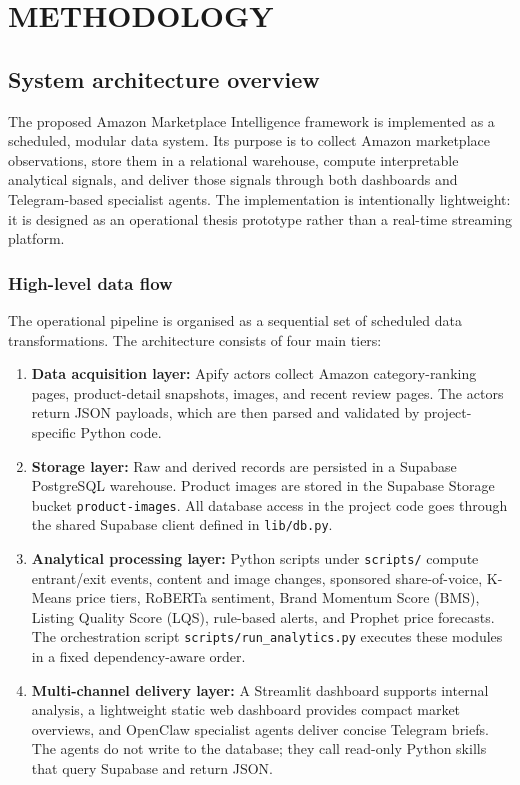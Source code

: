 \chapter{METHODOLOGY}
\label{chap:methodology}

\section{System architecture overview}

The proposed Amazon Marketplace Intelligence framework is implemented
as a scheduled, modular data system. Its purpose is to collect Amazon
marketplace observations, store them in a relational warehouse, compute
interpretable analytical signals, and deliver those signals through both
dashboards and Telegram-based specialist agents. The implementation is
intentionally lightweight: it is designed as an operational thesis
prototype rather than a real-time streaming platform.

\subsection{High-level data flow}

The operational pipeline is organised as a sequential set of scheduled
data transformations. The architecture consists of four main tiers:
\begin{enumerate}
    \item \textbf{Data acquisition layer:} Apify actors collect Amazon
    category-ranking pages, product-detail snapshots, images, and recent
    review pages. The actors return JSON payloads, which are then parsed
    and validated by project-specific Python code.

    \item \textbf{Storage layer:} Raw and derived records are persisted
    in a Supabase PostgreSQL warehouse. Product images are stored in the
    Supabase Storage bucket \texttt{product-images}. All database access
    in the project code goes through the shared Supabase client defined
    in \texttt{lib/db.py}.

    \item \textbf{Analytical processing layer:} Python scripts under
    \texttt{scripts/} compute entrant/exit events, content and image
    changes, sponsored share-of-voice, K-Means price tiers, RoBERTa
    sentiment, Brand Momentum Score (BMS), Listing Quality Score (LQS),
    rule-based alerts, and Prophet price forecasts. The orchestration
    script \texttt{scripts/run\_analytics.py} executes these modules in
    a fixed dependency-aware order.

    \item \textbf{Multi-channel delivery layer:} A Streamlit dashboard
    supports internal analysis, a lightweight static web dashboard
    provides compact market overviews, and OpenClaw specialist agents
    deliver concise Telegram briefs. The agents do not write to the
    database; they call read-only Python skills that query Supabase and
    return JSON.
\end{enumerate}

